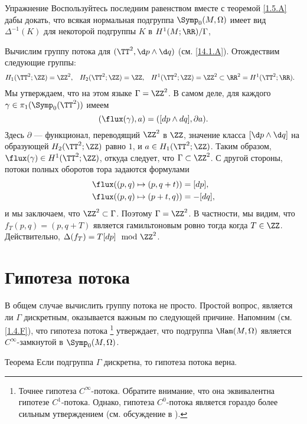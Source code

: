 \begin{ex}{Упражнение}\label{14.1.B}
Воспользуйтесь последним равенством вместе с теоремой \ref{1.5.A} дабы докать, что всякая нормальная подгруппа $\Symp_0(M,\Omega)$ имеет вид $\Delta^{-1}(K)$ для некоторой подгруппы $K$ в $H^1(M;\RR)/\Gamma$,
\end{ex}

Вычислим группу потока для $(\TT^2,\d p\wedge \d q)$ (см. \ref{14.1.A}).
Отождествим следующие группы: 
\begin{align*}
H_1(\TT^2;\ZZ)&=\ZZ^2,
&
H_2(\TT^2;\ZZ)&=\ZZ,
&
H^1(\TT^2;\ZZ)&=\ZZ^2
\subset
\RR^2=
H^1(\TT^2;\RR).
\end{align*}
Мы утверждаем, что на этом языке $\Gamma = \ZZ^2$.
В самом деле, для каждого $\gamma\in\pi_1(\Symp_0(\TT^2))$ имеем 
\[(\flux(\gamma), a) = ([dp \wedge dq], \partial a).\]
Здесь $\partial$ — функционал, переводящий $\ZZ^2$ в $\ZZ$, значение
класса $[\d p \wedge \d q]$ на образующей $H_2 (\TT^2;\ZZ)$ равно $1$,
и $a \in H_1 (\TT^2;\ZZ)$.
Таким образом, $\flux(\gamma)\in H^1(\TT^2;\ZZ)$, откуда следует, что
$\Gamma\subset \ZZ^2$.
С другой стороны, потоки полных оборотов тора задаются формулами 
\begin{align*}
\flux( (p, q) \mapsto (p , q+ t))
&=
[dp],
\\
\flux( (p, q) \mapsto (p+ t , q))
&=
-[dq],
\end{align*}
и мы заключаем, что $\ZZ^2 \subset  \Gamma$.
Поэтому $\Gamma = \ZZ^2$.
В частности, мы видим, что $f_T(p, q) = (p, q + T)$ является
гамильтоновым ровно тогда когда $T \in \ZZ$. 
Действительно, $\Delta(f_T) = T[dp] \mod{\ZZ^2}$.

\section{Гипотеза потока}

В общем случае вычислить группу потока не просто. 
Простой вопрос, является ли $\Gamma$ дискретным, оказывается важным по
следующей причине. 
Напомним (см. \ref{1.4.F}), что гипотеза потока%
\footnote{Точнее гипотеза $C^\infty$-потока.
Обратите внимание, что она эквивалентна гипотезе $C^1$-потока.
Однако, гипотеза $C^0$-потока является гораздо более сильным утверждением (см. обсуждение в \cite{LMP1}).}
утверждает, что подгруппа $\Ham(M,\Omega)$ является $C^\infty$-замкнутой в $\Symp_0(M,\Omega)$.

\begin{thm}{Теорема}\label{14.2.A}
Если подгруппа $\Gamma$ дискретна, то гипотеза потока верна. 
\end{thm}

